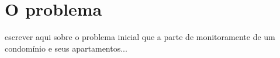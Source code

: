 \chapter{O problema}

escrever aqui sobre o problema inicial que a parte de monitoramente de um condomínio e seus apartamentos...
